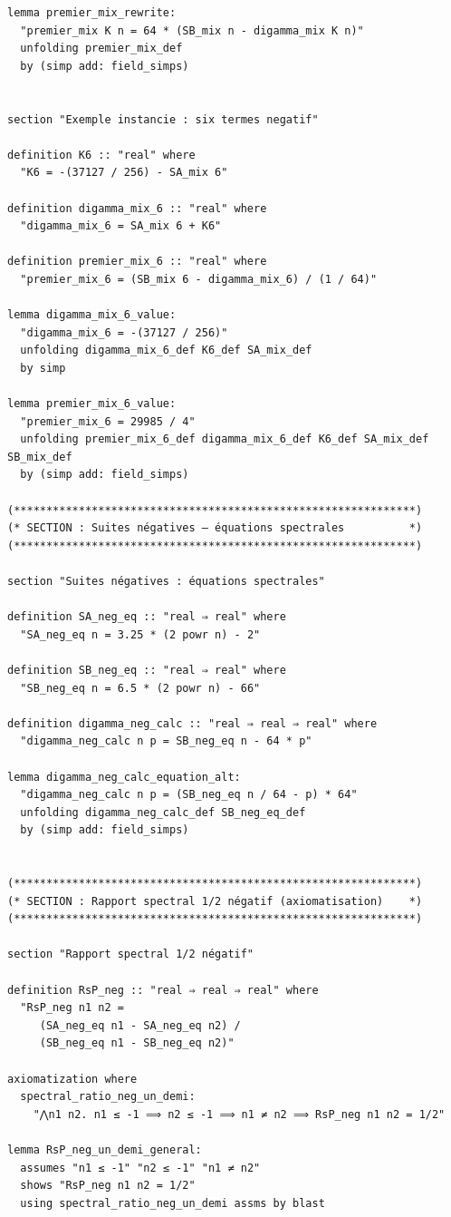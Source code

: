 \documentclass[a4paper,11pt]{article}
\begin{document}
\begin{holcode}[title={\textcolor{white}{Fichier : methode\_spectral.thy -- Partie 1/4}}]
\begin{lstlisting}
lemma premier_mix_rewrite:
  "premier_mix K n = 64 * (SB_mix n - digamma_mix K n)"
  unfolding premier_mix_def
  by (simp add: field_simps)


section "Exemple instancie : six termes negatif"

definition K6 :: "real" where
  "K6 = -(37127 / 256) - SA_mix 6"

definition digamma_mix_6 :: "real" where
  "digamma_mix_6 = SA_mix 6 + K6"

definition premier_mix_6 :: "real" where
  "premier_mix_6 = (SB_mix 6 - digamma_mix_6) / (1 / 64)"

lemma digamma_mix_6_value:
  "digamma_mix_6 = -(37127 / 256)"
  unfolding digamma_mix_6_def K6_def SA_mix_def
  by simp

lemma premier_mix_6_value:
  "premier_mix_6 = 29985 / 4"
  unfolding premier_mix_6_def digamma_mix_6_def K6_def SA_mix_def SB_mix_def
  by (simp add: field_simps)

(**************************************************************)
(* SECTION : Suites négatives – équations spectrales          *)
(**************************************************************)

section "Suites négatives : équations spectrales"

definition SA_neg_eq :: "real ⇒ real" where
  "SA_neg_eq n = 3.25 * (2 powr n) - 2"

definition SB_neg_eq :: "real ⇒ real" where
  "SB_neg_eq n = 6.5 * (2 powr n) - 66"

definition digamma_neg_calc :: "real ⇒ real ⇒ real" where
  "digamma_neg_calc n p = SB_neg_eq n - 64 * p"

lemma digamma_neg_calc_equation_alt:
  "digamma_neg_calc n p = (SB_neg_eq n / 64 - p) * 64"
  unfolding digamma_neg_calc_def SB_neg_eq_def
  by (simp add: field_simps)


(**************************************************************)
(* SECTION : Rapport spectral 1/2 négatif (axiomatisation)    *)
(**************************************************************)

section "Rapport spectral 1/2 négatif"

definition RsP_neg :: "real ⇒ real ⇒ real" where
  "RsP_neg n1 n2 =
     (SA_neg_eq n1 - SA_neg_eq n2) /
     (SB_neg_eq n1 - SB_neg_eq n2)"

axiomatization where
  spectral_ratio_neg_un_demi:
    "⋀n1 n2. n1 ≤ -1 ⟹ n2 ≤ -1 ⟹ n1 ≠ n2 ⟹ RsP_neg n1 n2 = 1/2"

lemma RsP_neg_un_demi_general:
  assumes "n1 ≤ -1" "n2 ≤ -1" "n1 ≠ n2"
  shows "RsP_neg n1 n2 = 1/2"
  using spectral_ratio_neg_un_demi assms by blast



\end{lstlisting}
\end{holcode}
\end{document}
